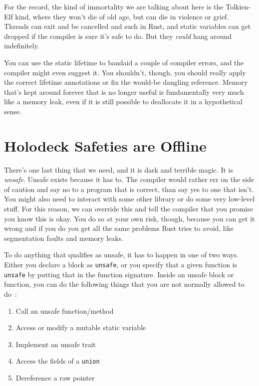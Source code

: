 \documentclass[a4paper]{report}
\begin{document}
For the record, the kind of immortality we are talking about here is the Tolkien-Elf kind, where they won't die of old age, but can die in violence or grief. Threads can exit and be cancelled and such in Rust, and static variables can get dropped if the compiler is sure it's safe to do. But they \textit{could} hang around indefinitely.

You can use the static lifetime to bandaid a couple of compiler errors, and the compiler might even suggest it. You shouldn't, though, you should really apply the correct lifetime annotations or fix the would-be dangling reference. Memory that's kept around forever that is no longer useful is fundamentally very much like a memory leak, even if it is still possible to deallocate it in a hypothetical sense.

\section*{Holodeck Safeties are Offline}
There's one last thing that we need, and it is dark and terrible magic. It is \textit{unsafe}. Unsafe exists because it has to. The compiler would rather err on the side of caution and say no to a program that is correct, than say yes to one that isn't. You might also need to interact with some other library or do some very low-level stuff. For this reason, we can override this and tell the compiler that you promise you know this is okay. You do so at your own risk, though, because you can get it wrong and if you do you get all the same problems Rust tries to avoid, like segmentation faults and memory leaks.

To do anything that qualifies as unsafe, it has to happen in one of two ways. Either you declare a block as \texttt{unsafe}, or you specify that a given function is \texttt{unsafe} by putting that in the function signature. Inside an unsafe block or function, you can do the following things that you are not normally allowed to do~\cite{rustdocs}:

\begin{enumerate}
	\item Call an unsafe function/method
	\item Access or modify a mutable static variable
	\item Implement an unsafe trait
	\item Access the fields of a \texttt{union}
	\item Dereference a raw pointer
\end{enumerate}
\end{document}

